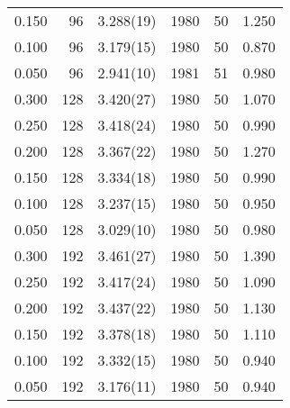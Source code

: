 \begin{tabular}{rrlrrr}
 0.150 &      96 & 3.288(19)  &                 1980 &                   50 &    1.250 \\
 0.100 &      96 & 3.179(15)  &                 1980 &                   50 &    0.870 \\
 0.050 &      96 & 2.941(10)  &                 1981 &                   51 &    0.980 \\
 0.300 &     128 & 3.420(27)  &                 1980 &                   50 &    1.070 \\
 0.250 &     128 & 3.418(24)  &                 1980 &                   50 &    0.990 \\
 0.200 &     128 & 3.367(22)  &                 1980 &                   50 &    1.270 \\
 0.150 &     128 & 3.334(18)  &                 1980 &                   50 &    0.990 \\
 0.100 &     128 & 3.237(15)  &                 1980 &                   50 &    0.950 \\
 0.050 &     128 & 3.029(10)  &                 1980 &                   50 &    0.980 \\
 0.300 &     192 & 3.461(27)  &                 1980 &                   50 &    1.390 \\
 0.250 &     192 & 3.417(24)  &                 1980 &                   50 &    1.090 \\
 0.200 &     192 & 3.437(22)  &                 1980 &                   50 &    1.130 \\
 0.150 &     192 & 3.378(18)  &                 1980 &                   50 &    1.110 \\
 0.100 &     192 & 3.332(15)  &                 1980 &                   50 &    0.940 \\
 0.050 &     192 & 3.176(11)  &                 1980 &                   50 &    0.940 \\
\hline
\end{tabular}

